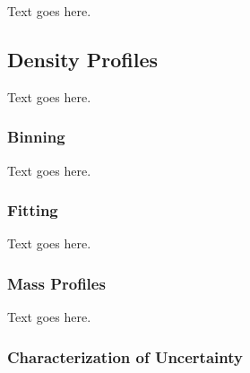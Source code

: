 Text goes here.




\subsection{Density Profiles}
\label{subsec:analysis--denisty_profiles}


Text goes here.



\subsubsection{Binning}
\label{subsubsec:analysis--density_profile--binning}


Text goes here.



\subsubsection{Fitting}
\label{subsubsec:analysis--density_profile--fitting}


Text goes here.



\subsubsection{Mass Profiles}
\label{subsubsec:analysis--density_profile--mass_profiles}


Text goes here.



\subsubsection{Characterization of Uncertainty}
\label{subsubsec:analysis--density_profile--uncertainty}



